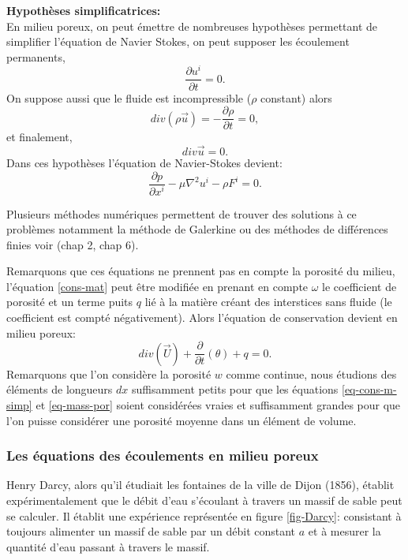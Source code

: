 \documentclass[a4paper,11pt]{article}
\numberwithin{equation}{section}
\begin{document}
\vspace{0.7cm}

\noindent \textbf{Hypothèses simplificatrices:}\\
En milieu poreux, on peut émettre de nombreuses hypothèses permettant de simplifier l'équation de Navier Stokes, on peut supposer les écoulement permanents,
\[\frac{\partial u^i}{\partial t}=0.\]
On suppose aussi que le fluide est incompressible ($\rho$ constant) alors
\[div(\rho \overrightarrow{u})=-\frac{\partial \rho}{\partial t}=0,\]
et finalement,
\[div \overrightarrow{u}=0.\]
Dans ces hypothèses l'équation de Navier-Stokes devient:
\begin{equation}
	\label{eq-cons-m-simp}
	\frac{\partial p}{\partial x^i}-\mu \nabla^2u^i-\rho F^i=0. 
\end{equation}

Plusieurs méthodes numériques permettent de trouver des solutions à ce problèmes notamment la méthode de Galerkine ou des méthodes de différences finies voir \cite{allaire2005analyse} (chap 2, chap 6). 

\vspace{7mm}

Remarquons que ces équations ne prennent pas en compte la porosité du milieu, l'équation \eqref{cons-mat} peut être modifiée en prenant en compte $\omega$ le coefficient de porosité et un terme puits $q$ lié à la matière créant des interstices sans fluide (le coefficient est compté négativement). Alors l'équation de conservation devient en milieu poreux:
\begin{equation}
	\label{eq-mass-por}
	div(\overrightarrow{U})+\frac{\partial}{\partial t}(\theta)+ q=0.
\end{equation}
Remarquons que l'on considère la porosité $w$ comme continue, nous étudions des éléments de longueurs $dx$ suffisamment petits pour que les équations \eqref{eq-cons-m-simp} et \eqref{eq-mass-por} soient considérées vraies et suffisamment grandes pour que l'on puisse considérer une porosité moyenne dans un élément de volume.

\subsubsection{Les équations des écoulements en milieu poreux}
\label{Darcy}
Henry Darcy, alors qu'il étudiait les fontaines de la ville de Dijon (1856), établit expérimentalement que le débit d'eau s'écoulant à travers un massif de sable peut se calculer. Il établit une expérience représentée en figure \ref{fig-Darcy}: consistant à toujours alimenter un massif de sable par un débit constant $a$ et à mesurer la quantité d'eau passant à travers le massif.
\end{document}

